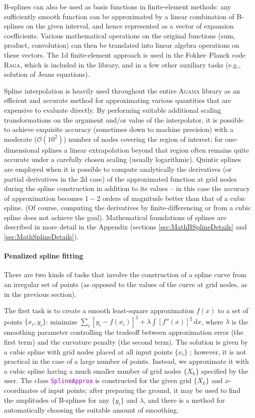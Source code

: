 \documentclass[12pt]{article}
\newcommand{\Agama}{\textsc{Agama}\xspace}
\newcommand{\Raga} {\textsc{Raga}\xspace}
\newcommand{\ttt}[1]{\textcolor{darkviolet}{\texttt{#1}}}
\renewcommand{\d}{\mathrm{d}}
\begin{document}
B-splines can also be used as basis functions in finite-element methods: any sufficiently smooth function can be approximated by a linear combination of B-splines on the given interval, and hence represented as a vector of expansion coefficients. Various mathematical operations on the original functions (sum, product, convolution) can then be translated into linear algebra operations on these vectors. The 1d finite-element approach is used in the Fokker--Planck code \Raga, which is included in the library, and in a few other auxiliary tasks (e.g., solution of Jeans equations).

Spline interpolation is heavily used throughout the entire \Agama library as an efficient and accurate method for approximating various quantities that are expensive to evaluate directly. By performing suitable additional scaling transformations on the argument and/or value of the interpolator, it is possible to achieve exquisite accuracy (sometimes down to machine precision) with a moderate ($\mathcal O(10^2)$) number of nodes covering the region of interest; for one-dimensional splines a linear extrapolation beyond that region often remains quite accurate under a carefully chosen scaling (usually logarithmic). Quintic splines are employed when it is possible to compute analytically the derivatives (or partial derivatives in the 2d case) of the approximated function at grid nodes during the spline construction in addition to its values -- in this case the accuracy of approximation becomes $1-2$ orders of magnitude better than that of a cubic spline. (Of course, computing the derivatives by finite-differencing or from a cubic spline does not achieve the goal).
Mathematical foundations of splines are described in more detail in the Appendix (sections \ref{sec:MathBSplineDetails} and \ref{sec:MathSplineDetails}).

\paragraph{Penalized spline fitting}  \label{sec:SplineFitting}
There are two kinds of tasks that involve the construction of a spline curve from an irregular set of points (as opposed to the values of the curve at grid nodes, as in the previous section).

The first task is to create a smooth least-square approximation $f(x)$ to a set of points $\{x_i, y_i\}$: 
minimize $\sum_i [y_i-f(x_i)]^2 + \lambda \int [f''(x)]^2\,\d x$, where $\lambda$ is the smoothing parameter controlling the tradeoff between approximation error (the first term) and the curvature penalty (the second term). The solution is given by a cubic spline with grid nodes placed at all input points $\{x_i\}$ \cite{GreenSilverman}; however, it is not practical in the case of a large number of points. Instead, we approximate it with a cubic spline having a much smaller number of grid nodes $\{X_k\}$ specified by the user. The class \ttt{SplineApprox} is constructed for the given grid  $\{X_k\}$ and $x$-coordinates of input points; after preparing the ground, it may be used to find the amplitudes of B-splines for any $\{y_i\}$ and $\lambda$, and there is a method for automatically choosing the suitable amount of smoothing.
\end{document}
